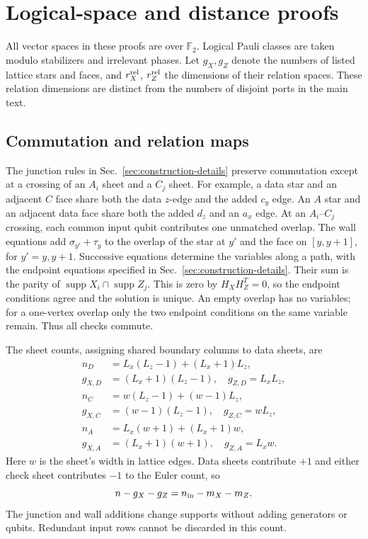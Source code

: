 \appendix
\section{Logical-space and distance proofs}
\label{app:slab-proof}

All vector spaces in these proofs are over $\mathbb F_2$. Logical Pauli
classes are taken modulo stabilizers and irrelevant phases. Let $g_X,g_Z$
denote the numbers of listed lattice stars and faces, and $r_X^{\rm rel}$,
$r_Z^{\rm rel}$ the dimensions of their relation spaces. These relation
dimensions are distinct from the numbers of disjoint ports in the main text.

\subsection{Commutation and relation maps}
The junction rules in Sec.~\ref{sec:construction-details} preserve
commutation except at a crossing of an $A_i$ sheet and a $C_j$ sheet.
For example, a data star and an adjacent $C$ face share both the data
$z$-edge and the added $c_y$ edge. An $A$ star and an adjacent data face
share both the added $d_z$ and an $a_x$ edge. At an $A_i$--$C_j$ crossing,
each common input qubit contributes one unmatched overlap. The wall
equations add $\sigma_{y'}+\tau_y$ to the overlap of the star at $y'$ and
the face on $[y,y+1]$, for $y'=y,y+1$. Successive equations determine
the variables along a path, with the endpoint equations specified in
Sec.~\ref{sec:construction-details}. Their sum is the parity of
$\operatorname{supp}X_i\cap\operatorname{supp}Z_j$. This is zero by
$H_XH_Z^T=0$, so the endpoint conditions agree and the solution is unique.
An empty overlap has no variables; for a one-vertex overlap only the two
endpoint conditions on the same variable remain. Thus all checks commute.

The sheet counts, assigning shared boundary columns to data sheets, are
\begin{align}
 n_D&=L_x(L_z-1)+(L_x+1)L_z,\nonumber\\
 g_{X,D}&=(L_x+1)(L_z-1),\quad g_{Z,D}=L_xL_z,\nonumber\\
 n_C&=w(L_z-1)+(w-1)L_z,\nonumber\\
 g_{X,C}&=(w-1)(L_z-1),\quad g_{Z,C}=wL_z,\nonumber\\
 n_A&=L_x(w+1)+(L_x+1)w,\nonumber\\
 g_{X,A}&=(L_x+1)(w+1),\quad g_{Z,A}=L_xw.
\end{align}
Here $w$ is the sheet's width in lattice edges. Data sheets contribute
$+1$ and either check sheet contributes $-1$ to the Euler count, so
\begin{equation}
 n-g_X-g_Z=n_{\rm in}-m_X-m_Z.
 \label{eq:rank-euler}
\end{equation}
The junction and wall additions change supports without adding generators
or qubits. Redundant input rows cannot be discarded in this count.

